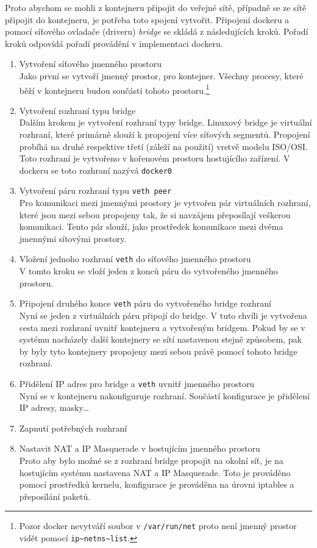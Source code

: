 Proto abychom se mohli z kontejneru připojit do veřejné sítě, případně se ze sítě připojit do kontejneru, je potřeba toto spojení vytvořit. Připojení  dockeru a pomocí síťového ovladače (driveru) \textit{bridge} se skládá z následujících kroků. Pořadí kroků odpovídá pořadí provádění v implementaci dockeru.
\begin{enumerate}
\item Vytvoření síťového jmenného prostoru \\
Jako první se vytvoří jmenný prostor, pro kontejner. Všechny procesy, které běží v kontejneru budou součástí tohoto prostoru.\footnote{Pozor docker nevytváří soubor v \verb-/var/run/net- proto není jmenný prostor vidět pomocí \verb-ip~netns~list-.}
\item Vytvoření rozhraní typu bridge \\
Dalším krokem je vytvoření rozhraní typy bridge. Linuxový bridge je virtuální rozhraní, které primárně slouží k propojení více síťových segmentů. Propojení probíhá na druhé respektive třetí (záleží na použití) vrstvě modelu ISO/OSI. Toto rozhraní je vytvořeno v kořenovém prostoru hostujícího zařízení. V dockeru se toto rozhraní nazývá \verb|docker0|
\item Vytvoření páru rozhraní typu \verb|veth peer|\\
Pro komunikaci mezi jmennými prostory je vytvořen pár virtuálních rozhraní, které jsou mezi sebou propojeny tak, že si navzájem přeposílají veškerou komunikaci. Tento pár slouží, jako prostředek komunikace mezi dvěma jmennými sítovými prostory.
\item Vložení jednoho rozhraní \verb|veth| do síťového jmenného prostoru \\
V tomto kroku se vloží jeden z konců páru do vytvořeného jmenného prostoru. 
\item Připojení druhého konce \verb|veth| páru do vytvořeného bridge rozhraní \\
Nyní se jeden z virtuálních páru připojí do bridge. V tuto chvíli je vytvořena cesta mezi rozhraní uvnitř kontejneru a vytvořeným bridgem. Pokud by se v systému nacházely další kontejnery se sítí nastavenou stejně způsobem, pak by byly tyto kontejnery propojeny mezi sebou právě pomocí tohoto bridge rozhraní.
\item Přidělení IP adres pro bridge a \verb|veth| uvnitř jmenného prostoru \\
Nyní se v kontejneru nakonfiguruje rozhraní. Součástí konfigurace je přidělení IP adresy, masky\ldots  
\item Zapnutí potřebných rozhraní\\
\item Nastavit NAT a IP Masquerade v hostujícím jmenného prostoru\\
Proto aby bylo možné se z rozhraní bridge propojit na okolní síť, je na hostujícím systému nastavena NAT a IP Masquerade. Toto je prováděno pomocí prostředků kernelu, konfigurace je prováděna na úrovni iptables a přeposílání paketů.
\end{enumerate}
